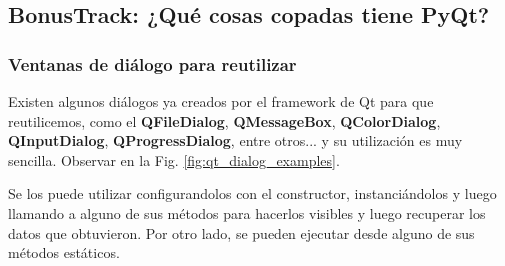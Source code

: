\subsection{BonusTrack: ¿Qu\'e cosas copadas tiene PyQt?}

\subsubsection{Ventanas de di\'alogo para reutilizar}
\label{dialogs_utiles}

Existen algunos di\'alogos ya creados por el framework de Qt para que reutilicemos,
como el \textbf{QFileDialog}, \textbf{QMessageBox}, \textbf{QColorDialog}, \textbf{QInputDialog}, \textbf{QProgressDialog},
entre otros... y su utilizaci\'on es muy sencilla. Observar en la Fig. \ref{fig:qt_dialog_examples}.

Se los puede utilizar configurandolos con el constructor, instanci\'andolos y luego llamando a alguno de sus m\'etodos para hacerlos
visibles y luego recuperar los datos que obtuvieron. Por otro lado, se pueden ejecutar desde alguno de sus m\'etodos est\'aticos.

